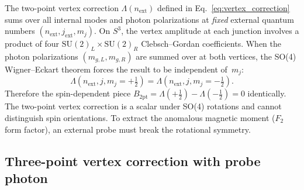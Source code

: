 \documentclass[11pt]{article}
\begin{document}
The two-point vertex correction $\Lambda(n_{\mathrm{ext}})$ defined
in Eq.~\eqref{eq:vertex_correction} sums over all internal modes and
photon polarizations at \emph{fixed} external quantum numbers
$(n_{\mathrm{ext}}, j_{\mathrm{ext}}, m_j)$.  On $S^3$, the vertex
amplitude at each junction involves a product of four
$\mathrm{SU}(2)_L \times \mathrm{SU}(2)_R$ Clebsch--Gordan
coefficients.  When the photon polarizations $(m_{g,L}, m_{g,R})$ are
summed over at both vertices, the SO(4) Wigner--Eckart theorem forces
the result to be independent of~$m_j$:
\begin{equation}
  \Lambda(n_{\mathrm{ext}}, j, m_j = +\tfrac{1}{2})
  = \Lambda(n_{\mathrm{ext}}, j, m_j = -\tfrac{1}{2}).
  \label{eq:B_zero_two_point}
\end{equation}
Therefore the spin-dependent piece
$B_{\mathrm{2pt}} = \Lambda(+\tfrac{1}{2}) - \Lambda(-\tfrac{1}{2}) = 0$
identically.  The two-point vertex correction is a scalar under SO(4)
rotations and cannot distinguish spin orientations.  To extract the
anomalous magnetic moment ($F_2$ form factor), an external probe must
break the rotational symmetry.

\subsection{Three-point vertex correction with probe photon}
\end{document}
